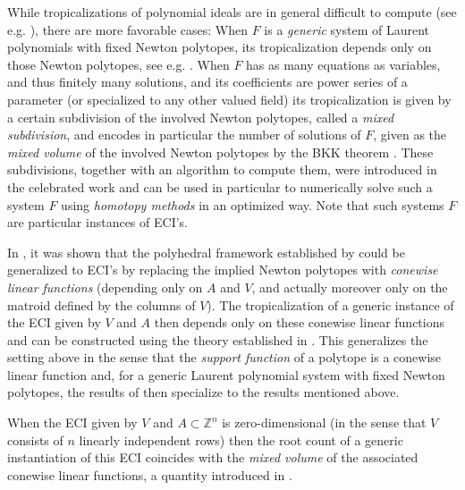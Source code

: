 \documentclass[a4paper]{article}
\theoremstyle{remark}
\def\ZZ{\mathbb{Z}}
\begin{document}
While tropicalizations of polynomial ideals are in general difficult
to compute (see e.g. \cite{bogartComputingTropicalVarieties2007}),
there are more favorable cases: When $F$ is a \textit{generic} system
of Laurent polynomials with fixed Newton polytopes, its
tropicalization depends only on those Newton polytopes, see
e.g. \cite{sturmfelsEliminationTheoryTropical,
  fultonIntersectionTheoryToric1997}. When $F$ has as many equations
as variables, and thus finitely many solutions, and its
  coefficients are power series of a parameter (or specialized to any
  other valued field) its tropicalization is given by a certain
subdivision of the involved Newton polytopes, called a \textit{mixed
  subdivision}, and encodes in particular the number of solutions of
$F$, given as the {\em mixed volume} of the involved Newton polytopes
by the BKK theorem \cite{bernshtein1975, kouchnirenko1976,
  khovanskii1995}. These subdivisions, together with an algorithm to
compute them, were introduced in the celebrated work \cite{huber1995}
and can be used in particular to numerically
solve such a system $F$ using \textit{homotopy methods}
\cite{sommese2005} in an optimized way. Note that such
systems $F$ are particular instances of ECI's.

In \cite{esterovEngineeredCompleteIntersections2024}, it was shown
that the polyhedral framework established by \cite{bernshtein1975,
  kouchnirenko1976, khovanskii1995} could be generalized to ECI's by
replacing the implied Newton polytopes with \textit{conewise linear
  functions} (depending only on $A$ and $V$, and actually moreover
only on the matroid defined by the columns of $V$). The
tropicalization of a generic instance of the ECI given by $V$ and $A$
then depends only on these conewise linear functions and can be
constructed using the theory established in
\cite{esterovTropicalVarietiesPolynomial2012}. This generalizes the
setting above in the sense that the \textit{support function} of a
polytope is a conewise linear function and, for a generic Laurent
polynomial system with fixed Newton polytopes, the results of
\cite{esterovEngineeredCompleteIntersections2024} then specialize to
the results mentioned above.

When the ECI given by $V$ and $A\subset \ZZ^n$ is zero-dimensional (in the
sense that $V$ consists of $n$ linearly independent rows) then the
root count of a generic instantiation of this ECI coincides with the
{\em mixed volume} of the associated conewise linear functions, a
quantity introduced in \cite{esterovTropicalVarietiesPolynomial2012}.
\end{document}
